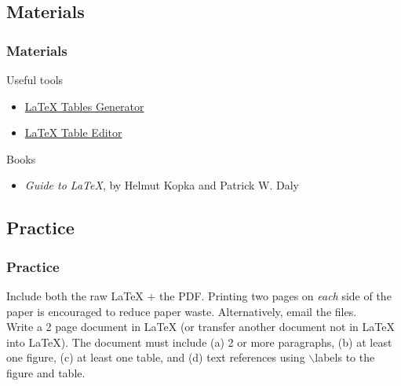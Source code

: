 \documentclass[slidestop,compress,mathserif]{beamer}
\begin{document}
\subsection[Materials]{Materials}
\begin{frame} 
		\frametitle{Materials}

		Useful tools
		\begin{itemize}
			\item \href{http://www.tablesgenerator.com/latex_tables}{LaTeX Tables Generator}
			\item \href{http://truben.no/table/}{LaTeX Table Editor}
		\end{itemize}
		Books
		\begin{itemize}
			\item \emph{Guide to LaTeX}, by Helmut Kopka and Patrick W. Daly
		\end{itemize}				
		
\end{frame}

\subsection[Practice]{Practice}
\begin{frame}
		\frametitle{Practice}
		
	Include both the raw LaTeX $+$ the PDF. Printing two pages on \emph{each} side of the paper is encouraged to reduce paper waste. Alternatively, email the files. \\[5mm]

	Write a 2 page document in LaTeX (or transfer another document not in LaTeX into LaTeX). The document must include (a) 2 or more paragraphs, (b) at least one figure, (c) at least one table, and (d) text references using {\color{command}$\backslash$label}s to the figure and table.
	
\end{frame}
\end{document}
